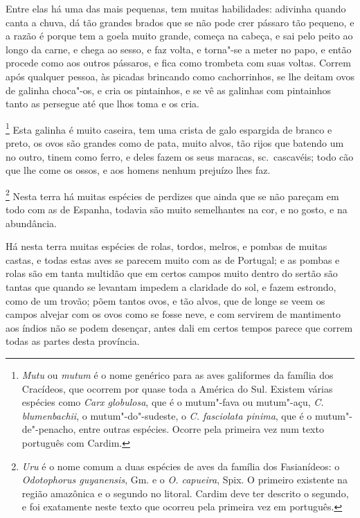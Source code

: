 \begin{linenumbers}
 Entre elas há uma das mais pequenas, tem muitas habilidades: adivinha
quando canta a chuva, dá tão grandes brados que se não pode crer pássaro
tão pequeno, e a razão é porque tem a goela muito grande, começa na
cabeça, e sai pelo peito ao longo da carne, e chega ao sesso, e faz
volta, e torna"-se a meter no papo, e então procede como aos outros
pássaros, e fica como trombeta com suas voltas. Correm após qualquer
pessoa, às picadas brincando como cachorrinhos, se lhe deitam ovos de
galinha choca"-os, e cria os pintainhos, e se vê as galinhas com
pintainhos tanto as persegue até que lhos toma e os cria. 

\footnote{ \textit{Mutu} ou \textit{mutum} é o nome
genérico para as aves galiformes da família dos Cracídeos, que ocorrem
por quase toda a América do Sul. Existem várias espécies como
\textit{Carx globulosa}, que é o mutum"-fava ou mutum"-açu, \textit{C.
blumenbachii}, o mutum"-do"-sudeste, o \textit{C. fasciolata pinima}, que
é o mutum"-de"-penacho, entre outras espécies. Ocorre pela primeira vez
num texto português com Cardim.} Esta galinha é muito
caseira, tem uma crista de galo espargida de branco e preto, os ovos
são grandes como de pata, muito alvos, tão rijos que batendo um no
outro, tinem como ferro, e deles fazem os seus maracas, sc.~cascavéis;
todo cão que lhe come os ossos, e aos homens nenhum prejuízo lhes faz. 

\footnote{ \textit{Uru} é o nome comum a duas espécies
de aves da família dos Fasianídeos: o \textit{Odotophorus guyanensis}, 
Gm. e o \textit{O. capueira}, Spix. O primeiro existente na região
amazônica e o segundo no litoral. Cardim deve ter descrito o segundo, e
foi exatamente neste texto que ocorreu pela primeira vez em
português.} Nesta terra há muitas espécies de perdizes que
ainda que se não pareçam em todo com as de Espanha, todavia são muito
semelhantes na cor, e no gosto, e na abundância. 

 Há nesta terra muitas espécies de rolas, tordos, melros, e pombas de
muitas castas, e todas estas aves se parecem muito com as de Portugal;
e as pombas e rolas são em tanta multidão que em certos campos muito
dentro do sertão são tantas que quando se levantam impedem a claridade
do sol, e fazem estrondo, como de um trovão; põem tantos ovos, e tão
alvos, que de longe se veem os campos alvejar com os ovos como se fosse
neve, e com servirem de mantimento aos índios não se podem desençar,
antes dali em certos tempos parece que correm todas as partes desta província. 


\end{linenumbers}
